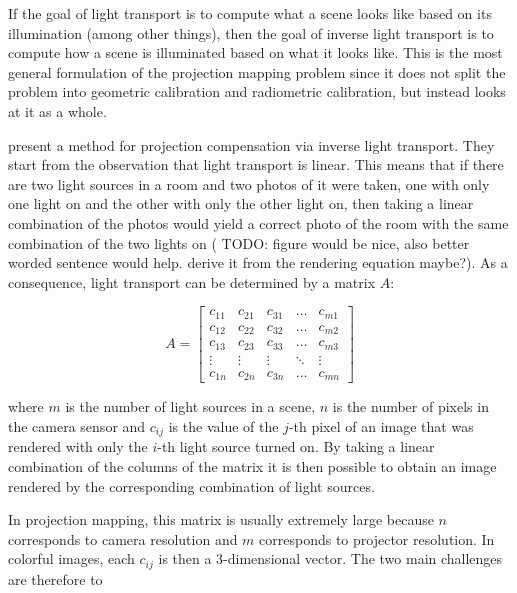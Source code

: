 If the goal of light transport is to compute what a scene looks like based on its illumination (among other things), then the goal of inverse light transport is to compute how a scene is illuminated based on what it looks like. This is the most general formulation of the projection mapping problem since it does not split the problem into geometric calibration and radiometric calibration, but instead looks at it as a whole.

\citet{Wetzstein2007} present a method for projection compensation via inverse light transport. They start from the observation that light transport is linear. This means that if there are two light sources in a room and two photos of it were taken, one with only one light on and the other with only the other light on, then taking a linear combination of the photos would yield a correct photo of the room with the same combination of the two lights on ({\color{red} TODO: figure would be nice, also better worded sentence would help. derive it from the rendering equation maybe?}). As a consequence, light transport can be determined by a matrix \(A\):

\begin{equation}
    \label{eq:lt_matrix}
    A = \begin{bmatrix}
        c_{11} & c_{21} & c_{31} & \dots & c_{m1} \\
        c_{12} & c_{22} & c_{32} & \dots & c_{m2} \\
        c_{13} & c_{23} & c_{33} & \dots & c_{m3} \\
        \vdots & \vdots & \vdots & \ddots & \vdots \\
        c_{1n} & c_{2n} & c_{3n} & \dots & c_{mn}
    \end{bmatrix}
\end{equation}

where \(m\) is the number of light sources in a scene, \(n\) is the number of pixels in the camera sensor and \(c_{ij}\) is the value of the \(j\)-th pixel of an image that was rendered with only the \(i\)-th light source turned on. By taking a linear combination of the columns of the matrix it is then possible to obtain an image rendered by the corresponding combination of light sources.

In projection mapping, this matrix is usually extremely large because \(n\) corresponds to camera resolution and \(m\) corresponds to projector resolution. In colorful images, each \(c_{ij}\) is then a 3-dimensional vector. The two main challenges are therefore to


